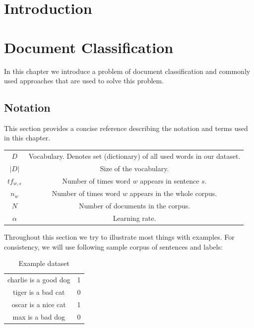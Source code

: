 \chapter*{Introduction}


\chapter{Document Classification}
    In this chapter we introduce a problem of document classification and commonly used approaches that are used to solve this problem.
    \* %
    
    \section{Notation}
        This section provides a concise reference describing the notation and terms used in this chapter.
        
        \begin{table}[h]
            \centering
            \begin{tabular}{c c}
                $D$ & Vocabulary. Denotes set (dictionary) of all used words in our dataset. \\
                $|D|$ & Size of the vocabulary. \\
                $tf_{w,s}$ & Number of times word $w$ appears in sentence $s$. \\
                $n_w$ & Number of times word $w$ appears in the whole corpus. \\
                $N$ & Number of documents in the corpus. \\
                $\alpha$ & Learning rate.
            \end{tabular}
        \end{table}
        
        Throughout this section we try to illustrate most things with examples. 
        For consistency, we will use following sample corpus of sentences and labels:
        
        \begin{table}[h]
            \centering
            \begin{tabular}{c|c}
            \hline
                charlie is a good dog & 1 \\
                tiger is a bad cat & 0 \\
                oscar is a nice cat & 1 \\
                max is a bad dog & 0 \\
            \end{tabular}
            \caption{Example dataset}
            \label{tab:example:dataset}

        \end{table}
        

